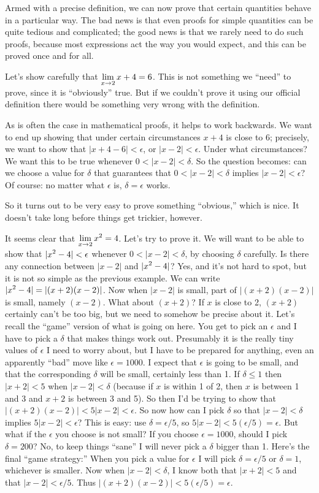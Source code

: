 Armed with a precise definition, we can now prove that certain
quantities behave in a particular way. The bad news is that even
proofs for simple quantities can be quite tedious and complicated; the
good news is that we rarely need to do such proofs, because most
expressions act the way you would expect, and this can be proved once
and for all.

\example\relax
{}
Let's show carefully that $\displaystyle \lim_{x\to 2} x+4 = 6$. This is not
something we ``need'' to prove, since it is ``obviously'' true. But if
we couldn't prove it using our official definition there would be
something very wrong with the definition.

As is often the case in mathematical proofs, it helps to work
backwards. We want to end up showing that under certain circumstances
$x+4$ is close to 6; precisely, we want to show that
$|x+4-6|<\epsilon$,
or $|x-2|<\epsilon$. Under what circumstances? We want this to be true
whenever $0<|x-2|<\delta$. So the question becomes: can we choose a
value for $\delta$ that guarantees that $0<|x-2|<\delta$ implies
$|x-2|<\epsilon$? Of course: no matter what $\epsilon$ is,
$\delta=\epsilon$ works.
\endexample

So it turns out to be very easy to prove something ``obvious,'' which
is nice. It doesn't take long before things get trickier, however.

\example
It seems clear that $\displaystyle \lim_{x\to 2} x^2=4$. Let's try to prove it. We
will want to be able to show that $\displaystyle |x^2-4|<\epsilon$ whenever 
$0<|x-2|<\delta$, by choosing $\delta$ carefully. Is there any
connection between $|x-2|$ and $\displaystyle |x^2-4|$? Yes, and it's not hard to
spot, but it is not so simple as the previous example. We can write
$\displaystyle |x^2-4|=|(x+2)(x-2)|$. Now when $|x-2|$ is small, part of 
$|(x+2)(x-2)|$ is small, namely $(x-2)$. What about $(x+2)$? If $x$ is
close to 2, $(x+2)$ certainly can't be too big, but we need to somehow
be precise about it. Let's recall the ``game'' version of what is
going on here. You get to pick an $\epsilon$ and I have to pick a
$\delta$ that makes things work out. Presumably it is the really tiny
values of $\epsilon$ I need to worry about, but I have to be prepared
for anything, even an apparently ``bad'' move like $\epsilon=1000$.
I expect that $\epsilon$ is going to be small, and that the
corresponding $\delta$ will be small, certainly less than 1.
If $\delta\le 1$ then
$|x+2|<5$ when $|x-2|<\delta$ (because if $x$ is
within 1 of 2, then $x$ is between 1 and 3 and $x+2$ is between 3 and
5). So then I'd be trying to show that
$|(x+2)(x-2)|<5|x-2|<\epsilon$. So now how can I pick $\delta$ so that 
$|x-2|<\delta$ implies $5|x-2|<\epsilon$? This is easy: use
$\delta=\epsilon/5$, so $5|x-2|<5(\epsilon/5) = \epsilon$. But what if
the $\epsilon$ you choose is not small? If you choose
$\epsilon=1000$, should I pick $\delta=200$? No, to keep things
``sane'' I will never pick a $\delta$ bigger than 1. Here's the final
``game strategy:'' When you pick a value for $\epsilon$ I will pick
$\delta=\epsilon/5$ or $\delta=1$, whichever is smaller. Now when 
$|x-2|<\delta$, I know both that $|x+2|<5$ and that
$|x-2|<\epsilon/5$. Thus $|(x+2)(x-2)|<5(\epsilon/5) = \epsilon$.

